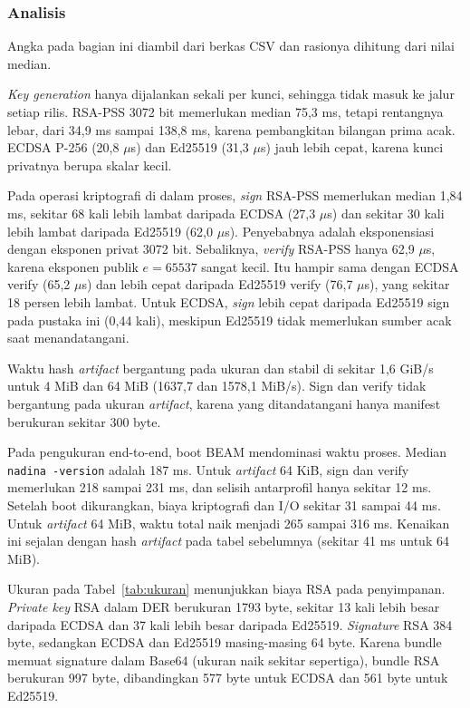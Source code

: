 \subsubsection*{Analisis}
Angka pada bagian ini diambil dari berkas CSV dan rasionya dihitung dari nilai median.

\textit{Key generation} hanya dijalankan sekali per kunci, sehingga tidak masuk ke jalur setiap
rilis. RSA-PSS 3072 bit memerlukan median 75,3 ms, tetapi rentangnya lebar, dari 34,9 ms sampai
138,8 ms, karena pembangkitan bilangan prima acak. ECDSA P-256 (20,8 $\mu$s) dan Ed25519 (31,3
$\mu$s) jauh lebih cepat, karena kunci privatnya berupa skalar kecil.

Pada operasi kriptografi di dalam proses, \textit{sign} RSA-PSS memerlukan median 1,84 ms, sekitar
68 kali lebih lambat daripada ECDSA (27,3 $\mu$s) dan sekitar 30 kali lebih lambat daripada Ed25519
(62,0 $\mu$s). Penyebabnya adalah eksponensiasi dengan eksponen privat 3072 bit. Sebaliknya,
\textit{verify} RSA-PSS hanya 62,9 $\mu$s, karena eksponen publik $e = 65537$ sangat kecil. Itu
hampir sama dengan ECDSA verify (65,2 $\mu$s) dan lebih cepat daripada Ed25519 verify (76,7 $\mu$s),
yang sekitar 18 persen lebih lambat. Untuk ECDSA, \textit{sign} lebih cepat daripada Ed25519 sign
pada pustaka ini (0,44 kali), meskipun Ed25519 tidak memerlukan sumber acak saat menandatangani.

Waktu hash \textit{artifact} bergantung pada ukuran dan stabil di sekitar 1,6 GiB/s untuk 4 MiB
dan 64 MiB (1637,7 dan 1578,1 MiB/s). Sign dan verify tidak bergantung pada ukuran \textit{artifact},
karena yang ditandatangani hanya manifest berukuran sekitar 300 byte.

Pada pengukuran end-to-end, boot BEAM mendominasi waktu proses. Median \texttt{nadina -version}
adalah 187 ms. Untuk \textit{artifact} 64 KiB, sign dan verify memerlukan 218 sampai 231 ms, dan
selisih antarprofil hanya sekitar 12 ms. Setelah boot dikurangkan, biaya kriptografi dan I/O
sekitar 31 sampai 44 ms. Untuk \textit{artifact} 64 MiB, waktu total naik menjadi 265 sampai 316 ms.
Kenaikan ini sejalan dengan hash \textit{artifact} pada tabel sebelumnya (sekitar 41 ms untuk 64 MiB).

Ukuran pada Tabel~\ref{tab:ukuran} menunjukkan biaya RSA pada penyimpanan. \textit{Private key}
RSA dalam DER berukuran 1793 byte, sekitar 13 kali lebih besar daripada ECDSA dan 37 kali lebih
besar daripada Ed25519. \textit{Signature} RSA 384 byte, sedangkan ECDSA dan Ed25519 masing-masing
64 byte. Karena bundle memuat signature dalam Base64 (ukuran naik sekitar sepertiga), bundle RSA
berukuran 997 byte, dibandingkan 577 byte untuk ECDSA dan 561 byte untuk Ed25519.

